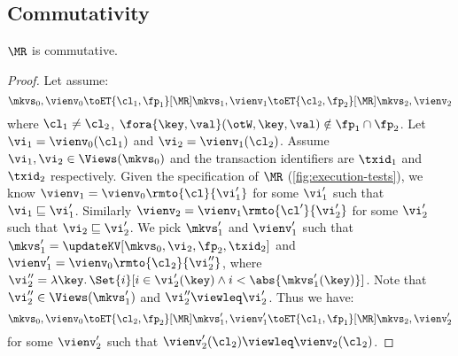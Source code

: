 \subsection{Commutativity}
\label{sec:comm-et-example}
\begin{lemma}
    \label{lem:mr-comm}
    \(\MR\) is commutative.
\end{lemma}
\begin{proof}
    Let assume:
    \[
        \mkvs_0, \vienv_0 \toET{\cl_1, \fp_1}[\MR] \mkvs_1, \vienv_1 \toET{\cl_2, \fp_2}[\MR] \mkvs_2, \vienv_2 
    \]
    where \( \cl_1 \neq \cl_2 \), \( \fora{ \key,\val } (\otW, \key, \val) \notin \fp_1 \cap \fp_2 \).
    Let \(\vi_1 = \vienv_0(\cl_1) \) and \( \vi_2 = \vienv_1(\cl_2)\).
    Assume \( \vi_1, \vi_2 \in \Views(\mkvs_0)\) and the transaction identifiers are \( \txid_1 \) and \( \txid_2 \) respectively.
    Given the specification of \(\MR\) (\cref{fig:execution-tests}), we know \( \vienv_1 = \vienv_0\rmto{\cl}{\vi'_1}\) for some \( \vi'_1 \) such that \( \vi_1 \sqsubseteq \vi'_1 \).
    Similarly \( \vienv_2 = \vienv_1\rmto{\cl'}{\vi'_2} \) for some \( \vi'_2 \) such that \(  \vi_2 \sqsubseteq \vi'_2 \). 
    We pick \( \mkvs'_1 \) and \( \vienv'_1 \) such that \( \mkvs'_1 = \updateKV[\mkvs_0,\vi_2,\fp_2,\txid_2] \) and \( \vienv'_1 = \vienv_0\rmto{\cl_2}{\vi''_2} \),
    where \( \vi''_2 = \lambda \key \ldotp \Set{ i }[ i \in \vi'_2(\key) \land i < \abs{\mkvs'_1(\key)}] \).
    Note that \( \vi''_2 \in \Views(\mkvs_1') \) and \( \vi''_2 \viewleq \vi'_2 \).
    Thus we have:
    \[
        \mkvs_0, \vienv_0 \toET{\cl_2, \fp_2}[\MR] \mkvs'_1, \vienv'_1 \toET{\cl_1,\fp_1}[\MR] \mkvs_2, \vienv'_2 
    \]
    for some \( \vienv'_2 \) such that \( \vienv'_2(\cl_2) \viewleq \vienv_2(\cl_2) \).
\end{proof}                                                                                    

